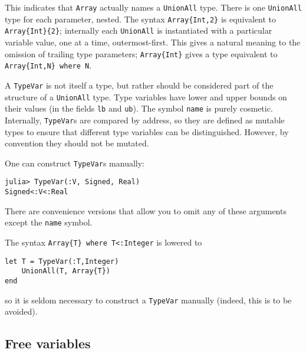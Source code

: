 This indicates that \texttt{Array} actually names a \texttt{UnionAll} type. There is one \texttt{UnionAll} type for each parameter, nested. The syntax \texttt{Array\{Int,2\}} is equivalent to \texttt{Array\{Int\}\{2\}}; internally each \texttt{UnionAll} is instantiated with a particular variable value, one at a time, outermost-first. This gives a natural meaning to the omission of trailing type parameters; \texttt{Array\{Int\}} gives a type equivalent to \texttt{Array\{Int,N\} where N}.



A \texttt{TypeVar} is not itself a type, but rather should be considered part of the structure of a \texttt{UnionAll} type. Type variables have lower and upper bounds on their values (in the fields \texttt{lb} and \texttt{ub}). The symbol \texttt{name} is purely cosmetic. Internally, \texttt{TypeVar}s are compared by address, so they are defined as mutable types to ensure that {\textquotedbl}different{\textquotedbl} type variables can be distinguished. However, by convention they should not be mutated.



One can construct \texttt{TypeVar}s manually:




\begin{verbatim}
julia> TypeVar(:V, Signed, Real)
Signed<:V<:Real
\end{verbatim}



There are convenience versions that allow you to omit any of these arguments except the \texttt{name} symbol.



The syntax \texttt{Array\{T\} where T<:Integer} is lowered to




\begin{verbatim}
let T = TypeVar(:T,Integer)
    UnionAll(T, Array{T})
end
\end{verbatim}



so it is seldom necessary to construct a \texttt{TypeVar} manually (indeed, this is to be avoided).



\hypertarget{10862279169779752699}{}


\subsection{Free variables}



